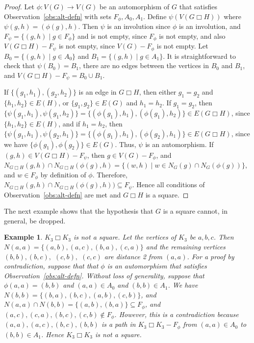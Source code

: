 \documentclass{article}
\newtheorem{example}[theorem]{Example}
\theoremstyle{definition}
\begin{document}
\begin{proof} Let $\phi:V(G)\rightarrow V(G)$ be an automorphism of $G$ that satisfies Observation~\ref{obs:alt-defn} with sets $F_{\phi}, A_0, A_1$. Define $\psi(V(G\Box H))$ where $\psi(g,h) = (\phi(g), h)$. Then $\psi$ is an involution since $\phi$ is an involution, and $F_{\psi}=\{(g,h)\;|\;g\in F_{\phi}\}$ and is not empty, since $F_{\phi}$ is not empty, and also $V(G\Box H)-F_{\psi}$ is not 
empty, since $V(G)-F_{\phi}$ is not empty. Let $B_0=\{(g,h)\;|\;g\in A_0\}$ and $B_1=\{(g,h)\;|\;g\in A_1\}$. It is straightforward to check that $\psi(B_0)=B_1$, there are no edges between the vertices in $B_0$ and $B_1$, and $V(G\Box H)-F_{\psi}=B_0\cup B_1$.

If $\{(g_1,h_1), (g_2, h_2)\}$ is an edge in $G\Box H$, then either $g_1=g_2$ and $\{h_1, h_2\}\in E(H)$, or $\{g_1, g_2\}\in E(G)$ and $h_1=h_2$. If $g_1=g_2$, then $\{\psi(g_1, h_1), \psi(g_1, h_2)\}=\{(\phi(g_1), h_1), (\phi(g_1), h_2)\}\in E(G\Box H)$, 
since $\{h_1,h_2\}\in E(H)$, and if $h_1=h_2$, then $\{\psi(g_1, h_1), \psi(g_2, h_1)\}=\{(\phi(g_1), h_1), (\phi(g_2),h_1)\}\in E(G\Box H)$, since we have $\{\phi(g_1), \phi(g_2)\}\in E(G)$. Thus, $\psi$ is an automorphism. 
If $(g,h)\in V(G\Box H)-F_{\psi}$, then $g\in V(G)-F_{\phi}$, and 
$N_{G\Box H}(g,h)\cap N_{G\Box H}(\phi(g),h)= \{(w,h)\;|\;w\in N_G(g)\cap N_G(\phi(g))\}$, and $w\in F_{\phi}$ by definition of $\phi$. Therefore, 
$N_{G\Box H}(g,h)\cap  N_{G\Box H}(\phi(g),h))\subseteq F_{\psi}$. 
Hence all conditions of Observation~\ref{obs:alt-defn} are met and $G\Box H$ is a square. 
\end{proof}

The next example shows that the hypothesis that $G$ is a square cannot, in general, be dropped. 

\begin{example} \label{exa:cartesian} \rm 
$K_3\Box K_3$ is not a square. Let the vertices of $K_3$ be $a,b,c$. Then $N(a,a)=\{(a,b), (a,c), (b,a), (c,a)\}$ and the remaining vertices $(b,b), (b,c),$ $ (c,b),$  $(c,c)$ are distance 2 from $(a,a)$. For a proof by contradiction, suppose that that $\phi$ is an automorphism that satisfies Observation~\ref{obs:alt-defn}. Without loss of generality, suppose that $\phi(a,a)=(b,b)$ and $(a,a)\in A_0$ and $(b,b)\in A_1$.  We have $N(b,b) =\{(b,a), (b,c), (a,b), (c,b)\}$, and $N(a,a)\cap N(b,b) = \{(a,b),(b,a) \}\subseteq F_{\phi}$, and $(a,c), (c,a), (b,c), (c,b) \not\in F_{\phi}$. However, this is a contradiction because $(a,a),(a,c),(b,c),(b,b)$ is a path in $K_3\Box K_3-F_{\phi}$ from $(a,a)\in A_0$ to $(b,b)\in A_1$. Hence $K_3\Box K_3$ is not a square. 
\end{example}
\end{document}
